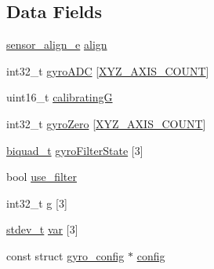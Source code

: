 \subsection*{Data Fields}
\begin{DoxyCompactItemize}
\item 
\hyperlink{sensors_8h_a64e3c71d4562f54f6e168ac1f597dcf8}{sensor\+\_\+align\+\_\+e} \hyperlink{structins__gyro_afa39619d279bb783258ec3e58c6b2bf7}{align}
\item 
int32\+\_\+t \hyperlink{structins__gyro_aadd2a1cb02540fb20514f38cc63f6aed}{gyro\+A\+D\+C} \mbox{[}\hyperlink{axis_8h_a93ac071aee723ba4580dfc8b72ae847f}{X\+Y\+Z\+\_\+\+A\+X\+I\+S\+\_\+\+C\+O\+U\+N\+T}\mbox{]}
\item 
uint16\+\_\+t \hyperlink{structins__gyro_a7ffee9eceb683050baa3aedb896d8f2a}{calibrating\+G}
\item 
int32\+\_\+t \hyperlink{structins__gyro_a623737e0c5e68b9f38d4cb324910ed0f}{gyro\+Zero} \mbox{[}\hyperlink{axis_8h_a93ac071aee723ba4580dfc8b72ae847f}{X\+Y\+Z\+\_\+\+A\+X\+I\+S\+\_\+\+C\+O\+U\+N\+T}\mbox{]}
\item 
\hyperlink{filter_8h_a7256a3fa62e7894f819ddd905006ad2e}{biquad\+\_\+t} \hyperlink{structins__gyro_a5d5828ee7a233007d5d302e91579d708}{gyro\+Filter\+State} \mbox{[}3\mbox{]}
\item 
bool \hyperlink{structins__gyro_a63337c4f06341f6c4d67b939d5dcc33d}{use\+\_\+filter}
\item 
int32\+\_\+t \hyperlink{structins__gyro_ad25b283565f864656329511ebd3f4d5a}{g} \mbox{[}3\mbox{]}
\item 
\hyperlink{maths_8h_a6274a436c6082d67601c5bf296afbcf2}{stdev\+\_\+t} \hyperlink{structins__gyro_ac95458826f5de85774e6d946774cf2b3}{var} \mbox{[}3\mbox{]}
\item 
const struct \hyperlink{structgyro__config}{gyro\+\_\+config} $\ast$ \hyperlink{structins__gyro_a847cf3732f27512a405d4b84cf27812d}{config}
\end{DoxyCompactItemize}


